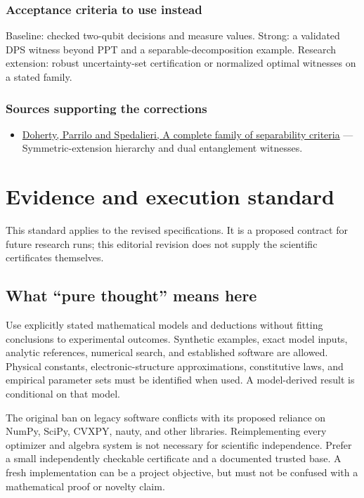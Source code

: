 \documentclass[
  11pt,
]{article}
\providecommand{\tightlist}{%
  \setlength{\itemsep}{0pt}\setlength{\parskip}{0pt}}
\begin{document}
\subsubsection{Acceptance criteria to use instead}

Baseline: checked two-qubit decisions and measure values. Strong: a
validated DPS witness beyond PPT and a separable-decomposition example.
Research extension: robust uncertainty-set certification or normalized
optimal witnesses on a stated family.

\subsubsection{Sources supporting the corrections}

\begin{itemize}
\tightlist
\item
  \href{https://arxiv.org/abs/quant-ph/0308032}{Doherty, Parrilo and
  Spedalieri, A complete family of separability criteria} ---
  Symmetric-extension hierarchy and dual entanglement witnesses.
\end{itemize}

\section{Evidence and execution standard}

This standard applies to the revised specifications. It is a proposed
contract for future research runs; this editorial revision does not
supply the scientific certificates themselves.

\subsection{What ``pure thought'' means here}

Use explicitly stated mathematical models and deductions without fitting
conclusions to experimental outcomes. Synthetic examples, exact model
inputs, analytic references, numerical search, and established software
are allowed. Physical constants, electronic-structure approximations,
constitutive laws, and empirical parameter sets must be identified when
used. A model-derived result is conditional on that model.

The original ban on legacy software conflicts with its proposed reliance
on NumPy, SciPy, CVXPY, nauty, and other libraries. Reimplementing every
optimizer and algebra system is not necessary for scientific
independence. Prefer a small independently checkable certificate and a
documented trusted base. A fresh implementation can be a project
objective, but must not be confused with a mathematical proof or novelty
claim.
\end{document}
